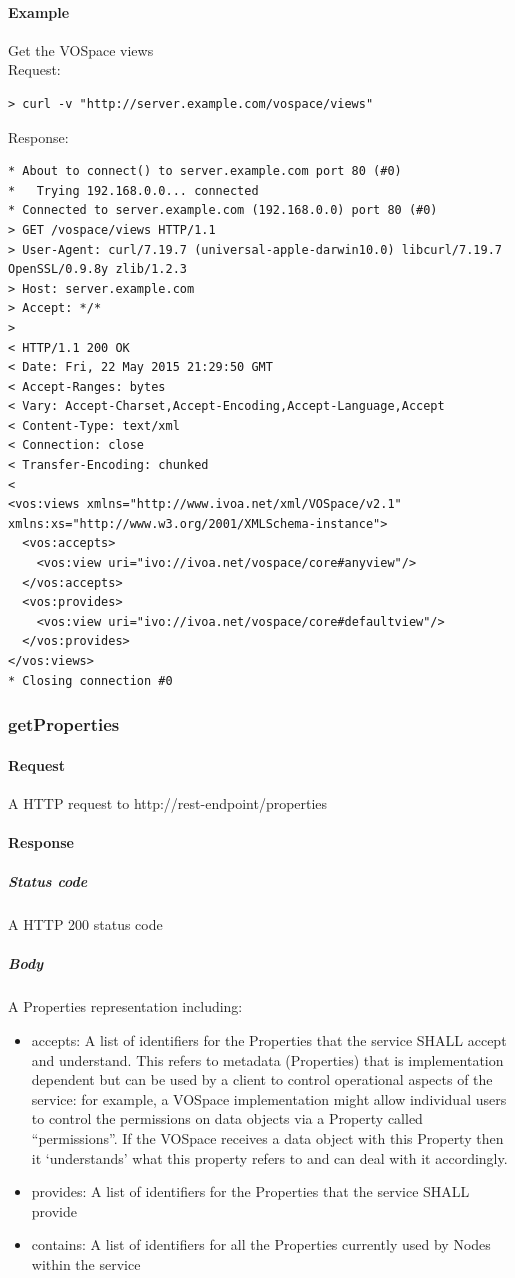 \documentclass[11pt,a4paper]{ivoa}
\begin{document}
\paragraph{Example}
Get the VOSpace views
\\[5px]
\noindent
Request:
\begin{lstlisting}
> curl -v "http://server.example.com/vospace/views"
\end{lstlisting}
Response:
\begin{lstlisting}
* About to connect() to server.example.com port 80 (#0)
*   Trying 192.168.0.0... connected
* Connected to server.example.com (192.168.0.0) port 80 (#0)
> GET /vospace/views HTTP/1.1
> User-Agent: curl/7.19.7 (universal-apple-darwin10.0) libcurl/7.19.7 OpenSSL/0.9.8y zlib/1.2.3
> Host: server.example.com
> Accept: */*
>
< HTTP/1.1 200 OK
< Date: Fri, 22 May 2015 21:29:50 GMT
< Accept-Ranges: bytes
< Vary: Accept-Charset,Accept-Encoding,Accept-Language,Accept
< Content-Type: text/xml
< Connection: close
< Transfer-Encoding: chunked
<
<vos:views xmlns="http://www.ivoa.net/xml/VOSpace/v2.1" xmlns:xs="http://www.w3.org/2001/XMLSchema-instance">
  <vos:accepts>
    <vos:view uri="ivo://ivoa.net/vospace/core#anyview"/>
  </vos:accepts>
  <vos:provides>
    <vos:view uri="ivo://ivoa.net/vospace/core#defaultview"/>
  </vos:provides>
</vos:views>
* Closing connection #0
\end{lstlisting}

\subsubsection{getProperties}
\label{subsubsec:getproperties}

\paragraph{Request}
A HTTP request to http://rest-endpoint/properties

\paragraph{Response}
\subparagraph{Status code} A HTTP 200 status code
\subparagraph{Body}
A Properties representation including:
\begin{itemize}
    \item accepts: A list of identifiers for the Properties that the service SHALL accept and understand. This refers to metadata (Properties) that is implementation dependent but can be used by a client to control operational aspects of the service: for example, a VOSpace implementation might allow individual users to control the permissions on data objects via a Property called ``permissions''. If the VOSpace receives a data object with this Property then it `understands' what this property refers to and can deal with it accordingly.
    \item provides: A list of identifiers for the Properties that the service SHALL provide
    \item contains: A list of identifiers for all the Properties currently used by Nodes within the service
\end{itemize}
\end{document}

